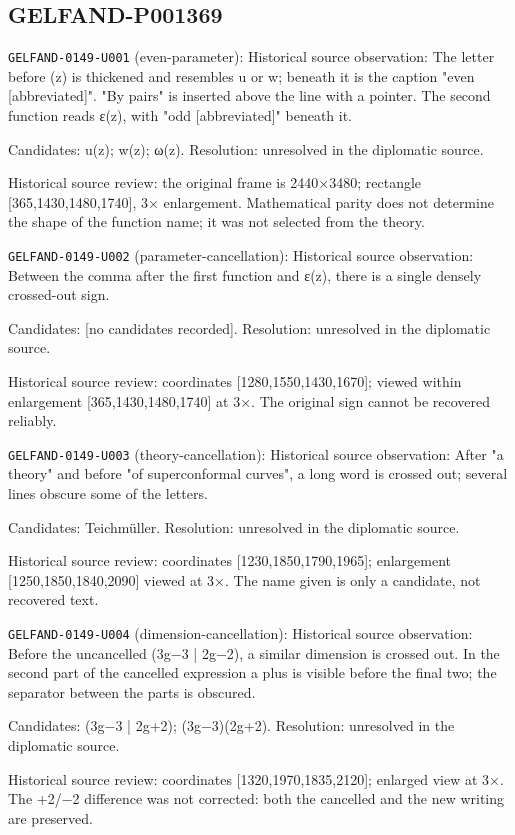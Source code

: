 \subsection*{GELFAND-P001369}
\noindent\texttt{GELFAND-0149-U001} (even-parameter): Historical source observation: The letter before (z) is thickened and resembles u or w; beneath it is the caption "even [abbreviated]". "By pairs" is inserted above the line with a pointer. The second function reads ε(z), with "odd [abbreviated]" beneath it.\par
Candidates: u(z); w(z); ω(z). Resolution: unresolved in the diplomatic source.\par
Historical source review: the original frame is 2440×3480; rectangle [365,1430,1480,1740], 3× enlargement. Mathematical parity does not determine the shape of the function name; it was not selected from the theory.\par

\noindent\texttt{GELFAND-0149-U002} (parameter-cancellation): Historical source observation: Between the comma after the first function and ε(z), there is a single densely crossed-out sign.\par
Candidates: [no candidates recorded]. Resolution: unresolved in the diplomatic source.\par
Historical source review: coordinates [1280,1550,1430,1670]; viewed within enlargement [365,1430,1480,1740] at 3×. The original sign cannot be recovered reliably.\par

\noindent\texttt{GELFAND-0149-U003} (theory-cancellation): Historical source observation: After "a theory" and before "of superconformal curves", a long word is crossed out; several lines obscure some of the letters.\par
Candidates: Teichmüller. Resolution: unresolved in the diplomatic source.\par
Historical source review: coordinates [1230,1850,1790,1965]; enlargement [1250,1850,1840,2090] viewed at 3×. The name given is only a candidate, not recovered text.\par

\noindent\texttt{GELFAND-0149-U004} (dimension-cancellation): Historical source observation: Before the uncancelled (3g−3 | 2g−2), a similar dimension is crossed out. In the second part of the cancelled expression a plus is visible before the final two; the separator between the parts is obscured.\par
Candidates: (3g−3 | 2g+2); (3g−3)(2g+2). Resolution: unresolved in the diplomatic source.\par
Historical source review: coordinates [1320,1970,1835,2120]; enlarged view at 3×. The +2/−2 difference was not corrected: both the cancelled and the new writing are preserved.\par

